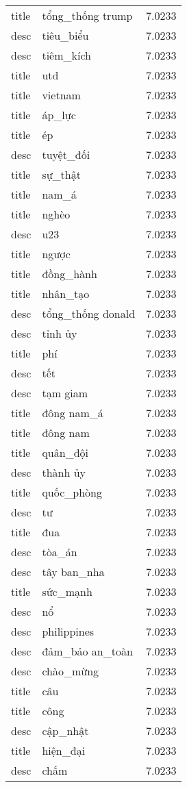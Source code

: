 \documentclass{article}
\begin{document}
\begin{tabular}{lll}
title & tổng\_thống trump & 7.0233\\
desc & tiêu\_biểu & 7.0233\\
desc & tiêm\_kích & 7.0233\\
title & utd & 7.0233\\
title & vietnam & 7.0233\\
title & áp\_lực & 7.0233\\
title & ép & 7.0233\\
desc & tuyệt\_đối & 7.0233\\
title & sự\_thật & 7.0233\\
title & nam\_á & 7.0233\\
title & nghèo & 7.0233\\
desc & u23 & 7.0233\\
title & ngược & 7.0233\\
title & đồng\_hành & 7.0233\\
title & nhân\_tạo & 7.0233\\
desc & tổng\_thống donald & 7.0233\\
desc & tỉnh ủy & 7.0233\\
title & phí & 7.0233\\
desc & tết & 7.0233\\
desc & tạm giam & 7.0233\\
title & đông nam\_á & 7.0233\\
title & đông nam & 7.0233\\
title & quân\_đội & 7.0233\\
desc & thành ủy & 7.0233\\
title & quốc\_phòng & 7.0233\\
desc & tư & 7.0233\\
title & đua & 7.0233\\
desc & tòa\_án & 7.0233\\
desc & tây ban\_nha & 7.0233\\
title & sức\_mạnh & 7.0233\\
desc & nổ & 7.0233\\
desc & philippines & 7.0233\\
desc & đảm\_bảo an\_toàn & 7.0233\\
desc & chào\_mừng & 7.0233\\
title & câu & 7.0233\\
title & công & 7.0233\\
desc & cập\_nhật & 7.0233\\
title & hiện\_đại & 7.0233\\
desc & chấm & 7.0233\\

\end{tabular}
\end{document}
